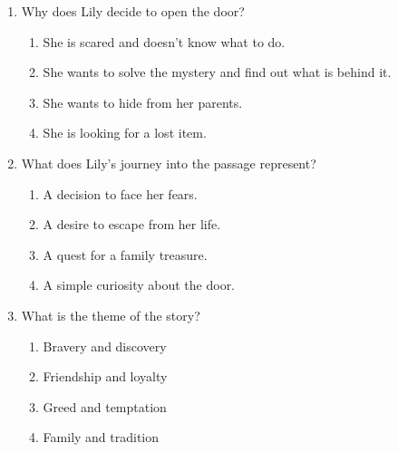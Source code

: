 \documentclass[12pt]{article}
\begin{document}
\begin{enumerate}
    \vspace{0.5cm}

    \item Why does Lily decide to open the door?
    \begin{enumerate}[label=\Alph*.]
        \item She is scared and doesn’t know what to do.
        \item She wants to solve the mystery and find out what is behind it.
        \item She wants to hide from her parents.
        \item She is looking for a lost item.
    \end{enumerate}

    \vspace{0.5cm}

    \item What does Lily’s journey into the passage represent?
    \begin{enumerate}[label=\Alph*.]
        \item A decision to face her fears.
        \item A desire to escape from her life.
        \item A quest for a family treasure.
        \item A simple curiosity about the door.
    \end{enumerate}

    \vspace{0.5cm}

    \item What is the theme of the story?
    \begin{enumerate}[label=\Alph*.]
        \item Bravery and discovery
        \item Friendship and loyalty
        \item Greed and temptation
        \item Family and tradition
    \end{enumerate}

\end{enumerate}
\end{document}
